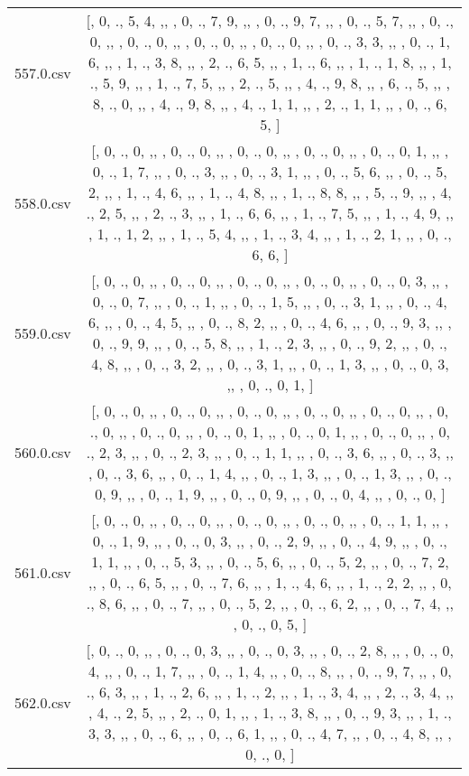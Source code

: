 \begin{table}[ht]
\begin{tabular}{@{}c c@{}}
	557.0.csv & [, 0, ., 5, 4, ,,  , 0, ., 7, 9, ,,  , 0, ., 9, 7, ,,  , 0, ., 5, 7, ,,  , 0, ., 0, ,,  , 0, ., 0, ,,  , 0, ., 0, ,,  , 0, ., 0, ,,  , 0, ., 3, 3, ,,  , 0, ., 1, 6, ,,  , 1, ., 3, 8, ,,  , 2, ., 6, 5, ,,  , 1, ., 6, ,,  , 1, ., 1, 8, ,,  , 1, ., 5, 9, ,,  , 1, ., 7, 5, ,,  , 2, ., 5, ,,  , 4, ., 9, 8, ,,  , 6, ., 5, ,,  , 8, ., 0, ,,  , 4, ., 9, 8, ,,  , 4, ., 1, 1, ,,  , 2, ., 1, 1, ,,  , 0, ., 6, 5, ]\\ 
	558.0.csv & [, 0, ., 0, ,,  , 0, ., 0, ,,  , 0, ., 0, ,,  , 0, ., 0, ,,  , 0, ., 0, 1, ,,  , 0, ., 1, 7, ,,  , 0, ., 3, ,,  , 0, ., 3, 1, ,,  , 0, ., 5, 6, ,,  , 0, ., 5, 2, ,,  , 1, ., 4, 6, ,,  , 1, ., 4, 8, ,,  , 1, ., 8, 8, ,,  , 5, ., 9, ,,  , 4, ., 2, 5, ,,  , 2, ., 3, ,,  , 1, ., 6, 6, ,,  , 1, ., 7, 5, ,,  , 1, ., 4, 9, ,,  , 1, ., 1, 2, ,,  , 1, ., 5, 4, ,,  , 1, ., 3, 4, ,,  , 1, ., 2, 1, ,,  , 0, ., 6, 6, ]\\ 
	559.0.csv & [, 0, ., 0, ,,  , 0, ., 0, ,,  , 0, ., 0, ,,  , 0, ., 0, ,,  , 0, ., 0, 3, ,,  , 0, ., 0, 7, ,,  , 0, ., 1, ,,  , 0, ., 1, 5, ,,  , 0, ., 3, 1, ,,  , 0, ., 4, 6, ,,  , 0, ., 4, 5, ,,  , 0, ., 8, 2, ,,  , 0, ., 4, 6, ,,  , 0, ., 9, 3, ,,  , 0, ., 9, 9, ,,  , 0, ., 5, 8, ,,  , 1, ., 2, 3, ,,  , 0, ., 9, 2, ,,  , 0, ., 4, 8, ,,  , 0, ., 3, 2, ,,  , 0, ., 3, 1, ,,  , 0, ., 1, 3, ,,  , 0, ., 0, 3, ,,  , 0, ., 0, 1, ]\\ 
	560.0.csv & [, 0, ., 0, ,,  , 0, ., 0, ,,  , 0, ., 0, ,,  , 0, ., 0, ,,  , 0, ., 0, ,,  , 0, ., 0, ,,  , 0, ., 0, ,,  , 0, ., 0, 1, ,,  , 0, ., 0, 1, ,,  , 0, ., 0, ,,  , 0, ., 2, 3, ,,  , 0, ., 2, 3, ,,  , 0, ., 1, 1, ,,  , 0, ., 3, 6, ,,  , 0, ., 3, ,,  , 0, ., 3, 6, ,,  , 0, ., 1, 4, ,,  , 0, ., 1, 3, ,,  , 0, ., 1, 3, ,,  , 0, ., 0, 9, ,,  , 0, ., 1, 9, ,,  , 0, ., 0, 9, ,,  , 0, ., 0, 4, ,,  , 0, ., 0, ]\\ 
	561.0.csv & [, 0, ., 0, ,,  , 0, ., 0, ,,  , 0, ., 0, ,,  , 0, ., 0, ,,  , 0, ., 1, 1, ,,  , 0, ., 1, 9, ,,  , 0, ., 0, 3, ,,  , 0, ., 2, 9, ,,  , 0, ., 4, 9, ,,  , 0, ., 1, 1, ,,  , 0, ., 5, 3, ,,  , 0, ., 5, 6, ,,  , 0, ., 5, 2, ,,  , 0, ., 7, 2, ,,  , 0, ., 6, 5, ,,  , 0, ., 7, 6, ,,  , 1, ., 4, 6, ,,  , 1, ., 2, 2, ,,  , 0, ., 8, 6, ,,  , 0, ., 7, ,,  , 0, ., 5, 2, ,,  , 0, ., 6, 2, ,,  , 0, ., 7, 4, ,,  , 0, ., 0, 5, ]\\ 
	562.0.csv & [, 0, ., 0, ,,  , 0, ., 0, 3, ,,  , 0, ., 0, 3, ,,  , 0, ., 2, 8, ,,  , 0, ., 0, 4, ,,  , 0, ., 1, 7, ,,  , 0, ., 1, 4, ,,  , 0, ., 8, ,,  , 0, ., 9, 7, ,,  , 0, ., 6, 3, ,,  , 1, ., 2, 6, ,,  , 1, ., 2, ,,  , 1, ., 3, 4, ,,  , 2, ., 3, 4, ,,  , 4, ., 2, 5, ,,  , 2, ., 0, 1, ,,  , 1, ., 3, 8, ,,  , 0, ., 9, 3, ,,  , 1, ., 3, 3, ,,  , 0, ., 6, ,,  , 0, ., 6, 1, ,,  , 0, ., 4, 7, ,,  , 0, ., 4, 8, ,,  , 0, ., 0, ]\\ 

\end{tabular}
\end{table}
